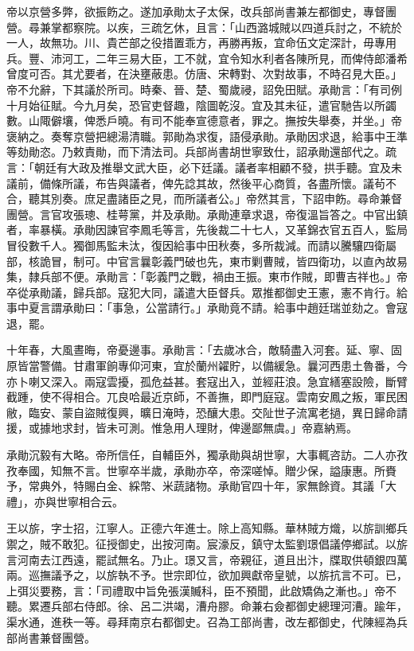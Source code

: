 \begin{pinyinscope}
帝以京營多弊，欲振飭之。遂加承勛太子太保，改兵部尚書兼左都御史，專督團營。尋兼掌都察院。以疾，三疏乞休，且言：「山西潞城賊以四道兵討之，不統於一人，故無功。川、貴芒部之役措置乖方，再勝再叛，宜命伍文定深計，毋專用兵。豐、沛河工，二年三易大臣，工不就，宜令知水利者各陳所見，而俾侍郎潘希曾度可否。其尤要者，在決壅蔽患。仿唐、宋轉對、次對故事，不時召見大臣。」帝不允辭，下其議於所司。時秦、晉、楚、蜀歲祲，詔免田賦。承勛言：「有司例十月始征賦。今九月矣，恐官吏督趣，陰圖乾沒。宜及其未征，遣官馳告以所蠲數。山陬僻壤，俾悉戶曉。有司不能奉宣德意者，罪之。撫按失舉奏，并坐。」帝褒納之。奏奪京營把總湯清職。郭勛為求復，語侵承勛。承勛因求退，給事中王準等劾勛恣。乃敕責勛，而下清法司。兵部尚書胡世寧致仕，詔承勛還部代之。疏言：「朝廷有大政及推舉文武大臣，必下廷議。議者率相顧不發，拱手聽。宜及未議前，備條所議，布告與議者，俾先諗其故，然後平心商質，各盡所懷。議茍不合，聽其別奏。庶足盡諸臣之見，而所議者公。」帝然其言，下詔申飭。尋命兼督團營。言官攻張璁、桂萼黨，并及承勛。承勛連章求退，帝復溫旨答之。中官出鎮者，率暴橫。承勛因諫官李鳳毛等言，先後裁二十七人，又革錦衣官五百人，監局冒役數千人。獨御馬監未汰，復因給事中田秋奏，多所裁減。而請以騰驤四衛屬部，核詭冒，制可。中官言曩彰義門破也先，東市剿曹賊，皆四衛功，以直內故易集，隸兵部不便。承勛言：「彰義門之戰，禍由王振。東市作賊，即曹吉祥也。」帝卒從承勛議，歸兵部。寇犯大同，議遣大臣督兵。眾推都御史王憲，憲不肯行。給事中夏言謂承勛曰：「事急，公當請行。」承勛竟不請。給事中趙廷瑞並劾之。會寇退，罷。

十年春，大風晝晦，帝憂邊事。承勛言：「去歲冰合，敵騎盡入河套。延、寧、固原皆當警備。甘肅軍餉專仰河東，宜於蘭州糴貯，以備緩急。曩河西患土魯番，今亦卜喇又深入。兩寇雲擾，孤危益甚。套寇出入，並經莊浪。急宜繕塞設險，斷臂截踵，使不得相合。兀良哈最近京師，不善撫，即門庭寇。雲南安鳳之叛，軍民困敝，臨安、蒙自盜賊復興，曠日淹時，恐釀大患。交阯世子流寓老撾，異日歸命請援，或據地求封，皆未可測。惟急用人理財，俾邊鄙無虞。」帝嘉納焉。

承勛沉毅有大略。帝所信任，自輔臣外，獨承勛與胡世寧，大事輒咨訪。二人亦孜孜奉國，知無不言。世寧卒半歲，承勛亦卒，帝深嗟悼。贈少保，謚康惠。所賚予，常典外，特賜白金、綵幣、米蔬諸物。承勛官四十年，家無餘資。其議「大禮」，亦與世寧相合云。

王以旂，字士招，江寧人。正德六年進士。除上高知縣。華林賊方熾，以旂訓鄉兵禦之，賊不敢犯。征授御史，出按河南。宸濠反，鎮守太監劉璟倡議停鄉試。以旂言河南去江西遠，罷試無名。乃止。璟又言，帝親征，道且出汴，牒取供頓銀四萬兩。巡撫議予之，以旂執不予。世宗即位，欲加興獻帝皇號，以旂抗言不可。已，上弭災要務，言：「司禮取中旨免張漢贓科，臣不預聞，此啟矯偽之漸也。」帝不聽。累遷兵部右侍郎。徐、呂二洪竭，漕舟膠。命兼右僉都御史總理河漕。踰年，渠水通，進秩一等。尋拜南京右都御史。召為工部尚書，改左都御史，代陳經為兵部尚書兼督團營。


\end{pinyinscope}
